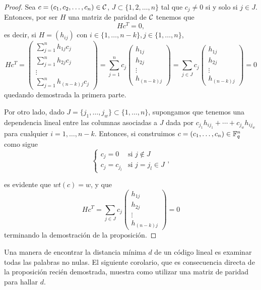 \begin{proof}
    Sea \(c = (c_1, c_2, \dots, c_n) \in \mathcal{C}\), \(J \subset \{1, 2, \dots, n\}\) tal que \(c_j \neq 0\) si y solo si \(j \in J\). Entonces, por ser \(H\) una matriz de paridad de \(\mathcal{C}\) tenemos que
    \[
    Hc^T = 0,
    \]
es decir, si \(H = (h_{ij})\) con \(i \in \{1,\dots, n-k\}, j \in \{1,\dots, n\}\),
\[
Hc^T =
\begin{pmatrix}
   \sum_{j=1}^n h_{1j} c_j \\
   \sum_{j=1}^n h_{2j} c_j \\
    \vdots \\
   \sum_{j=1}^n h_{(n-k)j} c_j
\end{pmatrix}
= \sum_{j=1}^n c_j
\begin{pmatrix}
    h_{1j}\\
    h_{2j}\\
    \vdots \\
    h_{(n-k)j}
\end{pmatrix}
= \sum_{j\in J} c_j
\begin{pmatrix}
    h_{1j}\\
    h_{2j}\\
    \vdots \\
    h_{(n-k)j}
\end{pmatrix}
= 0
\]
quedando demostrada la primera parte.

Por otro lado, dado \(J = \{j_1, \dots, j_w\} \subset \{1, \dots, n\}\), supongamos que tenemos una dependencia lineal entre las columnas asociadas a \(J\) dada por \(c_{j_1}h_{i j_1} + \cdots + c_{j_w} h_{i j_w}\) para cualquier \(i = 1, \dots, n-k\). Entonces, si construimos \(c = (c_1, \dots, c_n) \in \mathbb{F}_q^n\) como sigue
\[
\begin{cases}
    c_j = 0 & \text{si } j \not \in J \\
    c_j = c_{j_l} & \text{si } j = j_l \in J
\end{cases}
,\]

es evidente que \(wt(c) = w\), y que
\[
Hc^T = \sum_{j \in J} c_j
\begin{pmatrix}
    h_{1j}\\
    h_{2j}\\
    \vdots \\
    h_{(n-k)j}
\end{pmatrix} = 0
\]
terminando la demostración de la proposición.
\end{proof}

Una manera de encontrar la distancia mínima \(d\) de un código lineal es examinar todas las palabras no nulas. El siguiente corolario, que es consecuencia directa de la proposición recién demostrada, muestra como utilizar una matriz de paridad para hallar \(d\).

